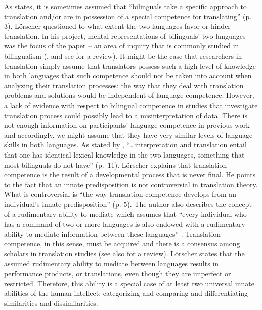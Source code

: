 \documentclass[output=paper]{langscibook}
\begin{document}
As \citet{lorscher1991translation} states, it is sometimes assumed that “bilinguals take a specific approach to translation and/or are in possession of a special competence for translating” (p. 3). Lörscher questioned to what extent the two languages favor or hinder translation. In his project, mental representations of bilinguals’ two languages was the focus of the paper -- an area of inquiry that is commonly studied in bilingualism (\citealt{paradis1985representation}, and see \citealt{kroll2008juggling} for a review). It might be the case that researchers in translation simply assume that translators possess such a high level of knowledge in both languages that such competence should not be taken into account when analyzing their translation processes: the way that they deal with translation problems and solutions would be independent of language competence. However, a lack of evidence with respect to bilingual competence in studies that investigate translation process could possibly lead to a misinterpretation of data. There is not enough information on participants’ language competence in previous work and accordingly, we might assume that they have very similar levels of language skills in both languages. As stated by \citet{grosjean2001bilingual}, “…interpretation and translation entail that one has identical lexical knowledge in the two languages, something that most bilinguals do not have” (p.~11). Lörscher explains that translation competence is the result of a developmental process that is never final. He points to the fact that an innate predisposition is not controversial in translation theory. What is controversial is “the way translation competence develops from an individual’s innate predisposition” (p. 5). The author also describes the concept of a rudimentary ability to mediate \citep{lorscher1991translation,lorscher1991thinking} which assumes that “every individual who has a command of two or more languages is also endowed with a rudimentary ability to mediate information between these languages” \citep[6]{Lorsche2014}. Translation competence, in this sense, must be acquired and there is a consensus among scholars in translation studies (see also \citealt{beeby2005investigating} for a review). Lörscher states that the assumed rudimentary ability to mediate between languages results in performance products, or translations, even though they are imperfect or restricted. Therefore, this ability is a special case of at least two universal innate abilities of the human intellect: categorizing and comparing and differentiating similarities and dissimilarities. 
\end{document}
